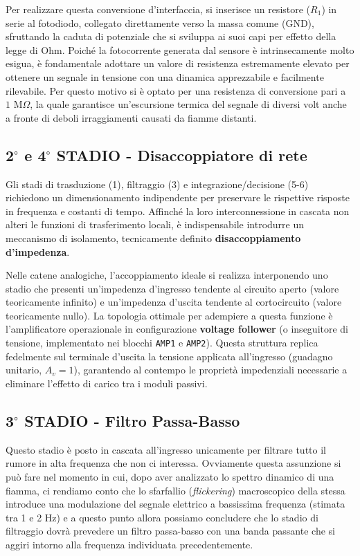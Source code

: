 \documentclass[12pt,a4paper]{article}
\begin{document}
        Per realizzare questa conversione d'interfaccia, si inserisce un resistore ($R_1$) in serie al fotodiodo, collegato direttamente verso 
        la massa comune (GND), sfruttando la caduta di potenziale che si sviluppa ai suoi capi per effetto della legge di Ohm. Poiché la fotocorrente 
        generata dal sensore è intrinsecamente molto esigua, è fondamentale adottare un valore di resistenza estremamente elevato per ottenere un segnale 
        in tensione con una dinamica apprezzabile e facilmente rilevabile. Per questo motivo si è optato per una resistenza di conversione pari a 
        $1\text{ M}\Omega$, la quale garantisce un'escursione termica del segnale di diversi volt anche a fronte di deboli irraggiamenti causati da fiamme distanti.
        
    \newpage

    \subsection{2$^\circ$ e 4$^\circ$ STADIO - Disaccoppiatore di rete}
        Gli stadi di trasduzione (1), filtraggio (3) e integrazione/decisione (5-6) richiedono un dimensionamento
        indipendente per preservare le rispettive risposte in frequenza e costanti di tempo. Affinché la loro
        interconnessione in cascata non alteri le funzioni di trasferimento locali, è indispensabile introdurre un
        meccanismo di isolamento, tecnicamente definito \textbf{disaccoppiamento d'impedenza}. 

        Nelle catene analogiche, l'accoppiamento ideale si realizza interponendo uno stadio che presenti un'impedenza
        d'ingresso tendente al circuito aperto (valore teoricamente infinito) e un'impedenza d'uscita tendente al cortocircuito
        (valore teoricamente nullo). La topologia ottimale per adempiere a questa funzione è l'amplificatore operazionale in
        configurazione \textbf{voltage follower} (o inseguitore di tensione, implementato nei blocchi \texttt{AMP1} e \texttt{AMP2}).
        Questa struttura replica fedelmente sul terminale d'uscita la tensione applicata all'ingresso (guadagno unitario, $A_v = 1$),
        garantendo al contempo le proprietà impedenziali necessarie a eliminare l'effetto di carico tra i moduli passivi.

    \subsection{3$^\circ$ STADIO - Filtro Passa-Basso}
        Questo stadio è posto in cascata all'ingresso unicamente per filtrare tutto il rumore in alta frequenza che non ci interessa.
        Ovviamente questa assunzione si può fare nel momento in cui, dopo aver analizzato lo spettro dinamico di una fiamma, ci rendiamo
        conto che lo sfarfallio (\textit{flickering}) macroscopico della stessa introduce una modulazione del segnale elettrico a bassissima
        frequenza (stimata tra 1 e 2 Hz) e a questo punto allora possiamo concludere che lo stadio di filtraggio dovrà prevedere un filtro
        passa-basso con una banda passante che si aggiri intorno alla frequenza individuata precedentemente.
\end{document}
